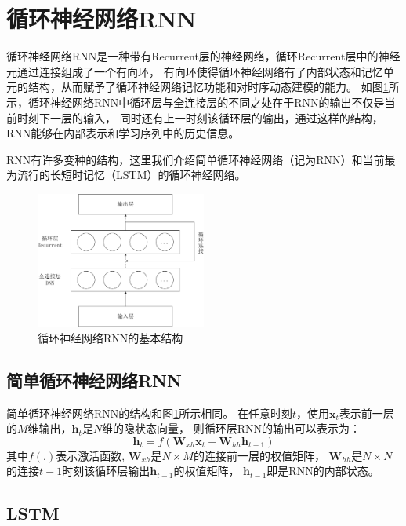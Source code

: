 \section{循环神经网络RNN}

循环神经网络RNN是一种带有Recurrent层的神经网络，循环Recurrent层中的神经元通过连接组成了一个有向环，
有向环使得循环神经网络有了内部状态和记忆单元的结构，从而赋予了循环神经网络记忆功能和对时序动态建模的能力。
如图\ref{fig:rnn}所示，循环神经网络RNN中循环层与全连接层的不同之处在于RNN的输出不仅是当前时刻下一层的输入，
同时还有上一时刻该循环层的输出，通过这样的结构，RNN能够在内部表示和学习序列中的历史信息。

RNN有许多变种的结构，这里我们介绍简单循环神经网络（记为RNN）和当前最为流行的长短时记忆（LSTM）的循环神经网络。


\begin{figure}[htbp]
\centering
\includegraphics[width=0.5\textwidth]{figures/chapter3/rnn-crop}
\caption{循环神经网络RNN的基本结构}
\label{fig:rnn}
\end{figure}

\subsection{简单循环神经网络RNN}

简单循环神经网络RNN的结构和图\ref{fig:rnn}所示相同。
在任意时刻$t$，使用$\textbf{x}_t$表示前一层的$M$维输出，$\textbf{h}_t$是$N$维的隐状态向量，
则循环层RNN的输出可以表示为：
\begin{equation}
\textbf{h}_t = f({\textbf{W}_{xh}}{\textbf{x}_t} + {\textbf{W}_{hh}}{\textbf{h}_{t-1}})
\end{equation}
其中$f(.)$表示激活函数, $\textbf{W}_{xh}$是$N \times M$的连接前一层的权值矩阵，
$\textbf{W}_{hh}$是$N \times N$的连接$t-1$时刻该循环层输出$\textbf{h}_{t-1}$的权值矩阵，
$\textbf{h}_{t-1}$即是RNN的内部状态。

\subsection{LSTM}

